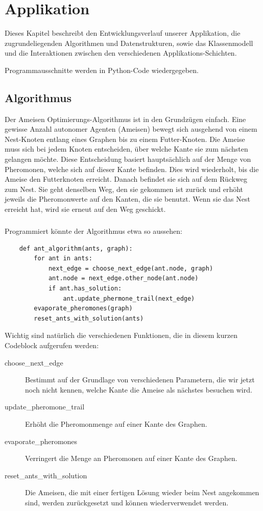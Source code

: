 
\chapter{Applikation}

Dieses Kapitel beschreibt den Entwicklungsverlauf unserer Applikation, die zugrundeliegenden Algorithmen und Datenstrukturen, sowie das Klassenmodell und die Interaktionen zwischen den verschiedenen Applikations-Schichten.

Programmausschnitte werden  in Python-Code wiedergegeben.

\section{Algorithmus}

Der Ameisen Optimierungs-Algorithmus ist in den Grundzügen einfach. Eine gewisse Anzahl autonomer Agenten (Ameisen) bewegt sich ausgehend von einem Nest-Knoten entlang eines Graphen bis zu einem Futter-Knoten. Die Ameise muss sich bei jedem Knoten entscheiden, über welche Kante sie zum nächsten gelangen möchte. Diese Entscheidung basiert hauptsächlich auf der Menge von Pheromonen, welche sich auf dieser Kante befinden. Dies wird wiederholt, bis die Ameise den Futterknoten erreicht. Danach befindet sie sich auf dem Rückweg zum Nest. Sie geht denselben Weg, den sie gekommen ist zurück und erhöht jeweils die Pheromonwerte auf den Kanten, die sie benutzt. Wenn sie das Nest erreicht hat, wird sie erneut auf den Weg geschickt.

\paragraph*{}
\noindent
Programmiert könnte der Algorithmus etwa so aussehen:

\begin{lstlisting}
	def ant_algorithm(ants, graph):
		for ant in ants:
			next_edge = choose_next_edge(ant.node, graph)
			ant.node = next_edge.other_node(ant.node)
			if ant.has_solution:
				ant.update_phermone_trail(next_edge)	
		evaporate_pheromones(graph)
		reset_ants_with_solution(ants)
\end{lstlisting}

Wichtig sind natürlich die verschiedenen Funktionen, die in diesem kurzen Codeblock aufgerufen werden:

\begin{description}
\item[choose\_next\_edge] Bestimmt auf der Grundlage von verschiedenen Parametern, die wir jetzt noch nicht kennen, welche Kante die Ameise als nächstes besuchen wird.
\item[update\_pheromone\_trail] Erhöht die Pheromonmenge auf einer Kante des Graphen.
\item[evaporate\_pheromones] Verringert die Menge an Pheromonen auf einer Kante des Graphen.
\item[reset\_ants\_with\_solution] Die Ameisen, die mit einer fertigen Lösung wieder beim Nest angekommen sind, werden zurückgesetzt und können wiederverwendet werden. 
\end{description}

